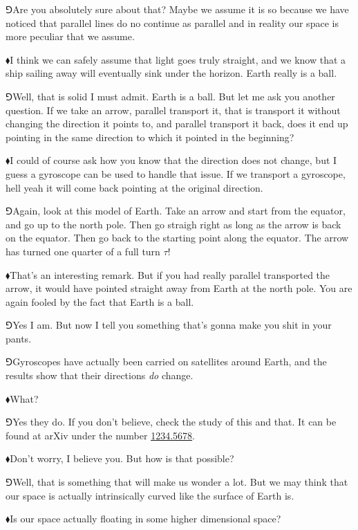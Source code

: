 \documentclass[10pt,oneside%
]{memoir}
\newcommand{\circc}{\tau}
\newcommand{\arxivreference}[1]{\url{#1}}
\newcommand{\hea}{\(\blacklozenge\)\;}
\newcommand{\heb}{\(\Game\)\;}
\begin{document}
\heb Are you absolutely sure about that? Maybe we assume it is so because we have noticed that parallel lines do no continue as parallel and in reality our space is more peculiar that we assume.

\hea I think we can safely assume that light goes truly straight, and we know that a ship sailing away will eventually sink under the horizon. Earth really is a ball.

\heb Well, that is solid I must admit. Earth is a ball. But let me ask you another question. If we take an arrow, parallel transport it, that is transport it without changing the direction it points to, and parallel transport it back, does it end up pointing in the same direction to which it pointed in the beginning?

\hea I could of course ask how you know that the direction does not change, but I guess a gyroscope can be used to handle that issue. If we transport a gyroscope, hell yeah it will come back pointing at the original direction.

\heb Again, look at this model of Earth. Take an arrow and start from the equator, and go up to the north pole. Then go straigh right as long as the arrow is back on the equator. Then go back to the starting point along the equator. The arrow has turned one quarter of a full turn \(\circc\)!

\hea That's an interesting remark. But if you had really parallel transported the arrow, it would have pointed straight away from Earth at the north pole. You are again fooled by the fact that Earth is a ball.

\heb Yes I am. But now I tell you something that's gonna make you shit in your pants.

\heb Gyroscopes have actually been carried on satellites around Earth, and the results show that their directions \emph{do} change.

\hea What?

\heb Yes they do. If you don't believe, check the study of this and that. It can be found at arXiv under the number \arxivreference{1234.5678}.

\hea Don't worry, I believe you. But how is that possible?

\heb Well, that is something that will make us wonder a lot. But we may think that our space is actually intrinsically curved like the surface of Earth is.

\hea Is our space actually floating in some higher dimensional space?
\end{document}
